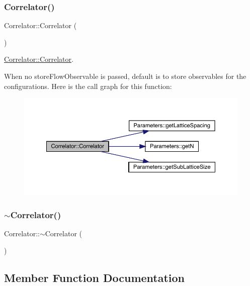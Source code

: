 \subsubsection{\texorpdfstring{Correlator()}{Correlator()}\hspace{0.1cm}{\footnotesize\ttfamily [2/2]}}
{\footnotesize\ttfamily Correlator\+::\+Correlator (\begin{DoxyParamCaption}{ }\end{DoxyParamCaption})}



\mbox{\hyperlink{class_correlator_aff48ef3bf789e9c6231eacc21cd9ed9a}{Correlator\+::\+Correlator}}. 

When no store\+Flow\+Observable is passed, default is to store observables for the configurations. Here is the call graph for this function\+:\nopagebreak
\begin{figure}[H]
\begin{center}
\leavevmode
\includegraphics[width=350pt]{class_correlator_a6114955836dba0b4b61138490cd3fe91_cgraph}
\end{center}
\end{figure}
\mbox{\label{class_correlator_a48307431ca91b41319c6b68c6684634d}} 
\subsubsection{\texorpdfstring{$\sim$Correlator()}{~Correlator()}}
{\footnotesize\ttfamily Correlator\+::$\sim$\+Correlator (\begin{DoxyParamCaption}{ }\end{DoxyParamCaption})\hspace{0.3cm}{\ttfamily [virtual]}}



\subsection{Member Function Documentation}
\mbox{\label{class_correlator_ab33502ff305f891c5c2e6d66a26a0247}} 
